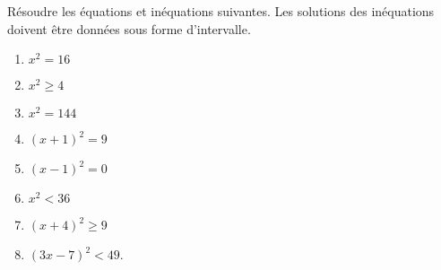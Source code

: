 
\begin{exercice}\label{exosmath-0177}

Résoudre les équations et inéquations suivantes. Les solutions des inéquations doivent être données sous forme d'intervalle.
\begin{multicols}{3}
    \begin{enumerate}
        \item
            \( x^2=16\)
        \item
            \( x^2\geq 4\)
        \item
            \( x^2=144\)
        \item
            \( (x+1)^2=9\)
        \item
            \( (x-1)^2=0\)
        \item
            \( x^2 <36\)
        \item
            \( (x+4)^2\geq 9\)
        \item
            \( (3x-7)^2<49\).
    \end{enumerate}
\end{multicols}

\end{exercice}
